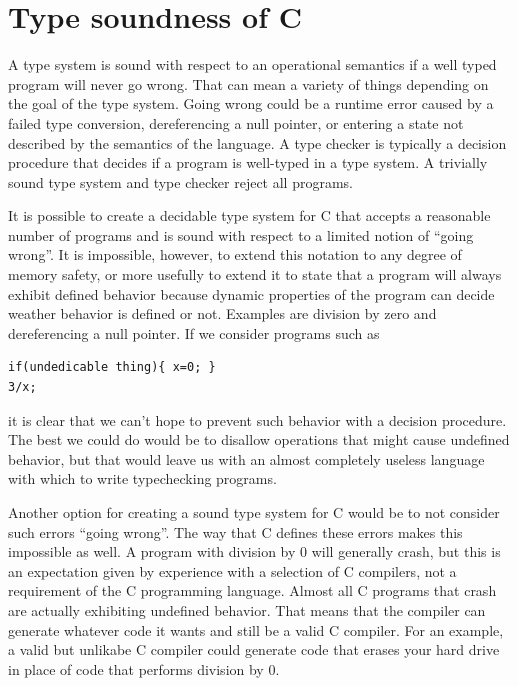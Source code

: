 \documentclass{puthesis}
\begin{document}
\section{Type soundness of C}

A type system is sound with respect to an operational semantics if a
well typed program will never go wrong. That can mean a variety of
things depending on the goal of the type system. Going wrong could be
a runtime error caused by a failed type conversion, dereferencing a
null pointer, or entering a state not described by the semantics of
the language. A type checker is typically a decision procedure that
decides if a program is well-typed in a type system. A trivially sound
type system and type checker reject all programs.

It is possible to create a decidable type system for C that accepts a reasonable
number of programs and is sound with respect to
a limited notion of ``going wrong''. It is impossible, however, to extend this
notation to any degree of memory safety, or more usefully to extend it
to state that a program will always exhibit defined behavior because
dynamic properties of the program can decide weather behavior is
defined or not. Examples are division by zero and dereferencing a null
pointer. If we consider programs such as

\begin{verbatim}
if(undedicable thing){ x=0; }
3/x;
\end{verbatim}

it is clear that we can't hope to prevent such behavior with a
decision procedure. The best we could do would be to
disallow operations that might cause undefined behavior, but that
would leave us with an almost completely useless language with which
to write typechecking programs. 

Another option for creating a sound
type system for C would be to not consider such errors ``going wrong''.
The way that C defines these errors makes this impossible as
well. A program with division by 0 will generally crash, but this is
an expectation given by experience with a selection of C compilers, not a requirement of the C
programming language. Almost all C
programs that crash are actually exhibiting undefined behavior. That means that
the compiler can generate whatever code it wants and still be a valid
C compiler. For an example, a valid but unlikabe C compiler could
generate code that erases your hard drive in place of code that
performs division by 0.
\end{document}
